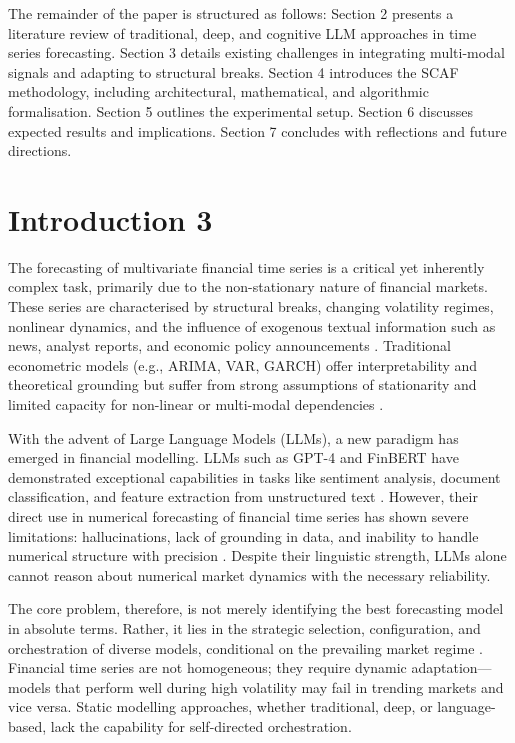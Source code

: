 \documentclass[conference]{IEEEtran}
\begin{document}
The remainder of the paper is structured as follows: Section 2 presents a literature review of traditional, deep, and cognitive LLM approaches in time series forecasting. Section 3 details existing challenges in integrating multi-modal signals and adapting to structural breaks. Section 4 introduces the SCAF methodology, including architectural, mathematical, and algorithmic formalisation. Section 5 outlines the experimental setup. Section 6 discusses expected results and implications. Section 7 concludes with reflections and future directions.


\section{Introduction 3}

The forecasting of multivariate financial time series is a critical yet inherently complex task, primarily due to the non-stationary nature of financial markets. These series are characterised by structural breaks, changing volatility regimes, nonlinear dynamics, and the influence of exogenous textual information such as news, analyst reports, and economic policy announcements \cite{bai1998bai, bollerslev1986garch}. Traditional econometric models (e.g., ARIMA, VAR, GARCH) offer interpretability and theoretical grounding but suffer from strong assumptions of stationarity and limited capacity for non-linear or multi-modal dependencies \cite{breiman2001randomforest}.

With the advent of Large Language Models (LLMs), a new paradigm has emerged in financial modelling. LLMs such as GPT-4 and FinBERT have demonstrated exceptional capabilities in tasks like sentiment analysis, document classification, and feature extraction from unstructured text \cite{huang2023finbertplus}. However, their direct use in numerical forecasting of financial time series has shown severe limitations: hallucinations, lack of grounding in data, and inability to handle numerical structure with precision \cite{wu2023bloomberggpt}. Despite their linguistic strength, LLMs alone cannot reason about numerical market dynamics with the necessary reliability.

The core problem, therefore, is not merely identifying the best forecasting model in absolute terms. Rather, it lies in the strategic selection, configuration, and orchestration of diverse models, conditional on the prevailing market regime \cite{yao2022react, zeng2022ltsflinear}. Financial time series are not homogeneous; they require dynamic adaptation—models that perform well during high volatility may fail in trending markets and vice versa. Static modelling approaches, whether traditional, deep, or language-based, lack the capability for self-directed orchestration.
\end{document}
